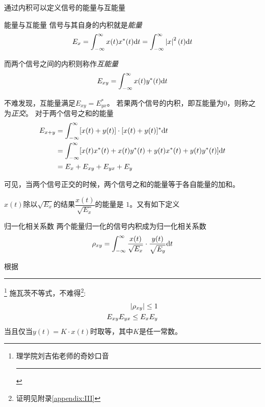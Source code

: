    通过内积可以定义信号的能量与互能量
    \begin{mydef}{能量与互能量}\label{def:energy}
        信号与其自身的内积就是\emph{能量}
        \begin{equation}
            E_x=\int_{-\infty}^{\infty}x(t)x^*(t)\text{\upshape d} t=\int_{-\infty}^{\infty}\left\vert x \right\vert^2(t)\text{\upshape d} t
        \end{equation}

        而两个信号之间的内积则称作\emph{互能量}
        \begin{equation}
            E_{xy}=\int_{-\infty}^{\infty}x(t)y^*(t)\text{\upshape d} t
        \end{equation}
    \end{mydef}
    不难发现，互能量满足$E_{xy}=E_{yx}^*$。
    若果两个信号的内积，即互能量为0，则称之为\emph{正交}。
    对于两个信号之和的能量
    \begin{equation}
        \begin{split}
            E_{x+y}&=\int_{-\infty}^{\infty}[x(t)+y(t)]\cdot[x(t)+y(t)]^*\text{\upshape d} t\\
                   &=\int_{-\infty}^{\infty}[x(t)x^*(t)+x(t)y^*(t)+y(t)x^*(t)+y(t)y^*(t)]\text{\upshape d} t\\
                   &=E_x+E_{xy}+E_{yx}+E_y 
        \end{split}
    \end{equation}

    可见，当两个信号正交的时候，两个信号之和的能量等于各自能量的加和。
    
    $x(t)$除以$\sqrt{E_x}$的结果$\dfrac{x(t)}{\sqrt{E_x}}$的能量是 $1$。又有如下定义
    \begin{mydef}{归一化相关系数}
        两个能量归一化的信号内积成为归一化相关系数
        \begin{equation}
            \rho_{xy}=\int_{-\infty}^{\infty}\frac{x(t)}{\sqrt{E_x}}\cdot\frac{y(t)}{\sqrt{E_y}}\text{\upshape d} t
        \end{equation}
    \end{mydef}

    根据\makebox[0pt][l]{\rule[0.3ex]{3em}{0.7pt}}\rule[1.2ex]{3em}{0.7pt}\footnote{理学院刘吉佑老师的奇妙口音\hspace{-13em}\rule[0.7ex]{13em}{0.7pt}}
    施瓦茨不等式，不难得\footnote{证明见\textcolor{bupt}{附录}\ref{appendix:III}}:
    \begin{align}
        \left\vert \rho_{xy} \right\vert\leq 1\\
        E_{xy}E_{yx}\leq E_xE_y
    \end{align}
    当且仅当$y(t)=K\cdot x(t)$时取等，其中$K$是任一常数。

